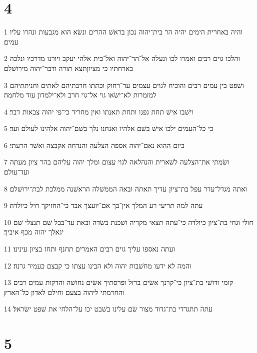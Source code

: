 \chapter{4}

\par 1 והיה באחרית הימים יהיה הר בית־יהוה נכון בראשׁ ההרים ונשׂא הוא מגבעות ונהרו עליו עמים׃
\par 2 והלכו גוים רבים ואמרו לכו ונעלה אל־הר־יהוה ואל־בית אלהי יעקב ויורנו מדרכיו ונלכה בארחתיו כי מציוןתצא תורה ודבר־יהוה מירושׁלם׃
\par 3 ושׁפט בין עמים רבים והוכיח לגוים עצמים עד־רחוק וכתתו חרבתיהם לאתים וחניתתיהם למזמרות לא־ישׂאו גוי אל־גוי חרב ולא־ילמדון עוד מלחמה׃
\par 4 וישׁבו אישׁ תחת גפנו ותחת תאנתו ואין מחריד כי־פי יהוה צבאות דבר׃
\par 5 כי כל־העמים ילכו אישׁ בשׁם אלהיו ואנחנו נלך בשׁם־יהוה אלהינו לעולם ועד׃
\par 6 ביום ההוא נאם־יהוה אספה הצלעה והנדחה אקבצה ואשׁר הרעתי׃
\par 7 ושׂמתי את־הצלעה לשׁארית והנהלאה לגוי עצום ומלך יהוה עליהם בהר ציון מעתה ועד־עולם׃
\par 8 ואתה מגדל־עדר עפל בת־ציון עדיך תאתה ובאה הממשׁלה הראשׁנה ממלכת לבת־ירושׁלם׃
\par 9 עתה למה תריעי רע המלך אין־בך אם־יועצך אבד כי־החזיקך חיל כיולדה׃
\par 10 חולי וגחי בת־ציון כיולדה כי־עתה תצאי מקריה ושׁכנת בשׂדה ובאת עד־בבל שׁם תנצלי שׁם יגאלך יהוה מכף איביך׃
\par 11 ועתה נאספו עליך גוים רבים האמרים תחנף ותחז בציון עינינו׃
\par 12 והמה לא ידעו מחשׁבות יהוה ולא הבינו עצתו כי קבצם כעמיר גרנה׃
\par 13 קומי ודושׁי בת־ציון כי־קרנך אשׂים ברזל ופרסתיך אשׂים נחושׁה והדקות עמים רבים והחרמתי ליהוה בצעם וחילם לאדון כל־הארץ׃
\par 14 עתה תתגדדי בת־גדוד מצור שׂם עלינו בשׁבט יכו על־הלחי את שׁפט ישׂראל׃

\chapter{5}

